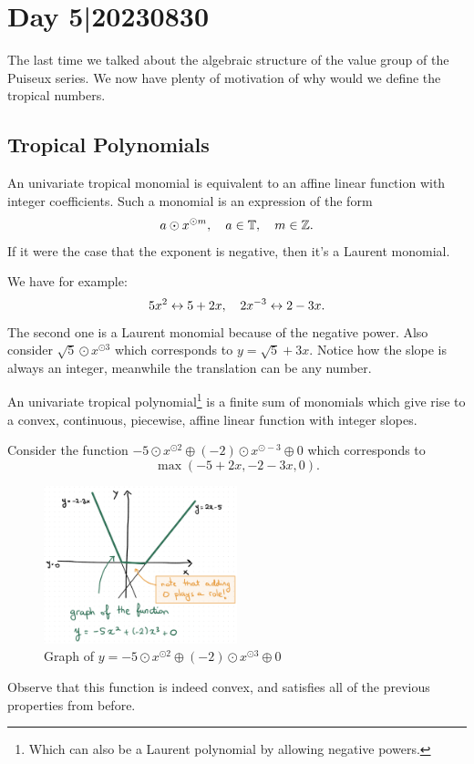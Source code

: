 \documentclass[12pt]{memoir}
\begin{document}
\section{Day 5|20230830}

The last time we talked about the algebraic structure of the value group of the Puiseux series. We now have plenty of motivation of why would we define the tropical numbers. 

\subsection{Tropical Polynomials}

An univariate tropical monomial is equivalent to an affine linear function with integer coefficients. Such a monomial is an expression of the form 
$$a\odot x^{\odot m},\quad a\in\mathbb{T},\quad m\in\mathbb{Z}.$$
If it were the case that the exponent is negative, then it's a Laurent monomial.

\begin{Ex}
    We have for example:
    $$5x^2\leftrightarrow 5+2x,\quad 2x^{-3}\leftrightarrow 2-3x.$$
    The second one is a Laurent monomial because of the negative power. Also consider $\sqrt 5\odot x^{\odot 3}$ which corresponds to $y=\sqrt{5}+3x$. Notice how the slope is always an integer, meanwhile the translation can be any number.
\end{Ex}

An univariate tropical polynomial\footnote{Which can also be a Laurent polynomial by allowing negative powers.} is a finite sum of monomials which give rise to a convex, continuous, piecewise, affine linear function with integer slopes. 

\begin{Ex}
    Consider the function $-5\odot x^{\odot2}\oplus(-2)\odot x^{\odot-3}\oplus 0$ which corresponds to 
    $$\max(-5+2x,-2-3x,0).$$
    \begin{figure}[h!]
        \centering
        \includegraphics[width=0.5\textwidth]{figs/fig3-1RenzoNotes3.png}
        \caption{Graph of $y=-5\odot x^{\odot 2}\oplus(-2)\odot x^{\odot 3}\oplus 0$}
        \label{fig:3.1-ConvPLFunc}
    \end{figure}
    Observe that this function is indeed convex, and satisfies all of the previous properties from before. 
\end{Ex}
\end{document}
